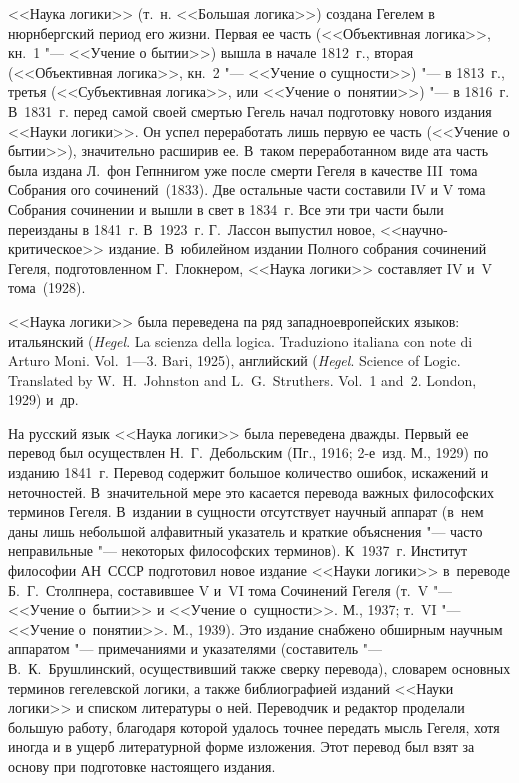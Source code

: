 <<Наука логики>> (т.~н. <<Большая логика>>) создана Гегелем в нюрнбергский
период его жизни. Первая ее часть (<<Объективная логика>>, кн.~1 "--- <<Учение
о бытии>>) вышла в начале 1812~г., вторая (<<Объективная логика>>, кн.~2 "---
<<Учение о сущности>>) "--- в 1813~г., третья (<<Субъективная логика>>, или
<<Учение о~понятии>>) "--- в 1816~г. В~1831~г. перед самой своей смертью Гегель
начал подготовку нового издания <<Науки логики>>. Он успел переработать лишь
первую ее часть (<<Учение о бытии>>), значительно расширив ее. В~таком
переработанном виде ата часть была издана Л.~фон Гепннигом уже после смерти
Гегеля в качестве III~тома Собрания ого сочинений~(1833). Две остальные части
составили IV и V тома Собрания сочинении и вышли в свет в 1834~г. Все эти три
части были переизданы в 1841~г. В~1923~г. Г.~Лассон выпустил новое,
<<научно-критическое>> издание. В~юбилейном издании Полного собрания сочинений
Гегеля, подготовленном Г.~Глокнером, <<Наука логики>>
составляет IV и~V тома~(1928).

<<Наука логики>> была переведена па ряд западноевропейских языков: итальянский
({\em Hegel}. La scienza della logica. Traduziono italiana con note di Arturo
Moni. Vol.~1---3. Bari, 1925), английский ({\em Hegel}. Science of Logic.
Translated by W.~H.~Johnston and L.~G.~Struthers. Vol.~1 and~2. London, 1929)
и~др.

На русский язык <<Наука логики>> была переведена дважды. Первый ее перевод был
осуществлен Н.~Г.~Дебольским (Пг., 1916; 2-е~изд. М., 1929) по изданию 1841~г.
Перевод содержит большое количество ошибок, искажений и неточностей.
В~значительной мере это касается перевода важных философских терминов Гегеля.
В~издании в сущности отсутствует научный аппарат (в~нем даны лишь небольшой
алфавитный указатель и краткие объяснения "--- часто неправильные "---
некоторых философских терминов). К~1937~г. Институт философии АН~СССР
подготовил новое издание <<Науки логики>> в~переводе Б.~Г.~Столпнера,
составившее V и~VI тома Сочинений Гегеля (т.~V "--- <<Учение о~бытии>> и
<<Учение о~сущности>>. М., 1937; т.~VI "--- <<Учение о~понятии>>. М., 1939).
Это издание снабжено обширным научным аппаратом "--- примечаниями и указателями
(составитель "--- В.~К.~Брушлинский, осуществивший также сверку перевода),
словарем основных терминов гегелевской логики, а также библиографией изданий
<<Науки логики>> и списком литературы о ней. Переводчик и редактор проделали
большую работу, благодаря которой удалось точнее передать мысль Гегеля, хотя
иногда и в ущерб литературной форме изложения. Этот перевод был взят за основу
при подготовке настоящего издания.

\bigskip

\begin{center}
~~~~~~
\end{center}

\bigskip

\begin{footnotesize}
\printpagenotes
\end{footnotesize}

